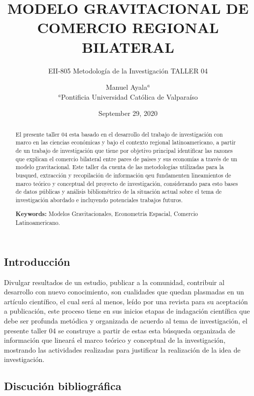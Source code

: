 \documentclass[
  spanish,
  twocolumn]{article}
\title{\textbf{MODELO GRAVITACIONAL DE COMERCIO REGIONAL BILATERAL}}
\subtitle{EII-805 Metodología de la Investigación TALLER 04}
\author{Manuel Ayala\(^a\)\\
\(^a\)Pontificia Universidad Católica de Valparaíso}
\date{September 29, 2020}
\begin{document}
\maketitle
\begin{abstract}
El presente taller 04 esta basado en el desarrollo del trabajo de
investigación con marco en las ciencias económicas y bajo el contexto
regional latinoamericano, a partir de un trabajo de investigación que
tiene por objetivo principal identificar las razones que explican el
comercio bilateral entre pares de paises y sus economías a través de un
modelo gravitacional. Este taller da cuenta de las metodologías
utilizadas para la busqued, extracción y recopilación de información qeu
fundamenten lineamientos de marco teórico y conceptual del proyecto de
investigación, considerando para esto bases de datos públicas y análisis
bibliométrico de la situación actual sobre el tema de investigación
abordado e incluyendo potenciales trabajos futuros.

\textbf{Keywords:} Modelos Gravitacionales, Econometría Espacial,
Comercio Latinoamericano.
\end{abstract}

\hypertarget{introducciuxf3n}{%
\subsection{Introducción}\label{introducciuxf3n}}

Divulgar resultados de un estudio, publicar a la comunidad, contribuir
al desarrollo con nuevo conocimiento, son cualidades que quedan
plasmadas en un artículo
científico\autocite{vallina-hernandez_gravity_2020}, el cual será al
menos, leído por una revista para su aceptación a publicación, este
proceso tiene en sus inicios etapas de indagación científica que debe
ser profunda metódica y organizada de acuerdo al tema de investigación,
el presente taller 04 se construye a partir de estas esta búsqueda
organizada de información que lineará el marco teórico y conceptual de
la investigación, mostrando las actividades realizadas para justificar
la realización de la idea de investigación.

\hypertarget{discuciuxf3n-bibliogruxe1fica}{%
\subsection{Discución
bibliográfica}\label{discuciuxf3n-bibliogruxe1fica}}
\end{document}

